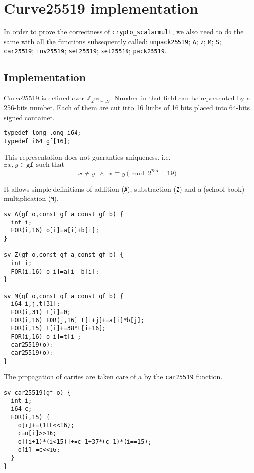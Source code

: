 \section{Curve25519 implementation}

In order to prove the correctness of \texttt{crypto\_scalarmult},
 we also need to do the same with all the functions subsequently called:
\texttt{unpack25519}; \texttt{A}; \texttt{Z}; \texttt{M}; \texttt{S};
\texttt{car25519}; \texttt{inv25519}; \texttt{set25519}; \texttt{sel25519};
\texttt{pack25519}.

\subsection{Implementation}

Curve25519 is defined over $\mathbb{Z}_{2^{255}-19}$. Number in that field can
be represented by a 256-bits number. Each of them are cut into 16 limbs of 16
bits placed into 64-bits signed container.
\begin{lstlisting}[language=Ctweetnacl]
typedef long long i64;
typedef i64 gf[16];
\end{lstlisting}
This representation does not guaranties uniqueness. i.e.\\
$\exists x,y \in \texttt{gf} \text{ such that }$
\vspace{-0.25cm}
  $$x \neq y\ \ \land\ \ x \equiv y \pmod{2^{255}-19}$$

It allows simple definitions of addition (\texttt{A}),
substraction (\texttt{Z}) and a (school-book) multiplication (\texttt{M}).
\begin{lstlisting}[language=Ctweetnacl]
sv A(gf o,const gf a,const gf b) {
  int i;
  FOR(i,16) o[i]=a[i]+b[i];
}

sv Z(gf o,const gf a,const gf b) {
  int i;
  FOR(i,16) o[i]=a[i]-b[i];
}

sv M(gf o,const gf a,const gf b) {
  i64 i,j,t[31];
  FOR(i,31) t[i]=0;
  FOR(i,16) FOR(j,16) t[i+j]+=a[i]*b[j];
  FOR(i,15) t[i]+=38*t[i+16];
  FOR(i,16) o[i]=t[i];
  car25519(o);
  car25519(o);
}
\end{lstlisting}

The propagation of carries are taken care of a by the \texttt{car25519} function.
\begin{lstlisting}[language=Ctweetnacl]
sv car25519(gf o) {
  int i;
  i64 c;
  FOR(i,15) {
    o[i]+=(1LL<<16);
    c=o[i]>>16;
    o[(i+1)*(i<15)]+=c-1+37*(c-1)*(i==15);
    o[i]-=c<<16;
  }
}
\end{lstlisting}


